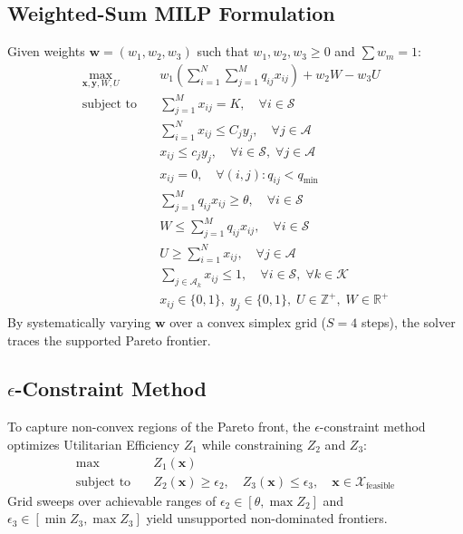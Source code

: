 \subsection{Weighted-Sum MILP Formulation}
Given weights $\mathbf{w} = (w_1, w_2, w_3)$ such that $w_1, w_2, w_3 \ge 0$ and $\sum w_m = 1$:
\begin{align}
    \max_{\mathbf{x}, \mathbf{y}, W, U} \quad & w_1 \left( \sum_{i=1}^N \sum_{j=1}^M q_{ij} x_{ij} \right) + w_2 W - w_3 U \label{eq:milp_obj} \\
    \text{subject to} \quad & \sum_{j=1}^M x_{ij} = K, \quad \forall i \in \mathcal{S} \label{eq:milp_c1} \\
    & \sum_{i=1}^N x_{ij} \le C_j y_j, \quad \forall j \in \mathcal{A} \label{eq:milp_c2} \\
    & x_{ij} \le c_j y_j, \quad \forall i \in \mathcal{S}, \; \forall j \in \mathcal{A} \label{eq:milp_c3} \\
    & x_{ij} = 0, \quad \forall (i, j): q_{ij} < q_{\min} \label{eq:milp_c4} \\
    & \sum_{j=1}^M q_{ij} x_{ij} \ge \theta, \quad \forall i \in \mathcal{S} \label{eq:milp_c5} \\
    & W \le \sum_{j=1}^M q_{ij} x_{ij}, \quad \forall i \in \mathcal{S} \label{eq:milp_w} \\
    & U \ge \sum_{i=1}^N x_{ij}, \quad \forall j \in \mathcal{A} \label{eq:milp_u} \\
    & \sum_{j \in \mathcal{A}_k} x_{ij} \le 1, \quad \forall i \in \mathcal{S}, \; \forall k \in \mathcal{K} \label{eq:milp_c7} \\
    & x_{ij} \in \{0, 1\}, \; y_j \in \{0, 1\}, \; U \in \mathbb{Z}^+, \; W \in \mathbb{R}^+
\end{align}
By systematically varying $\mathbf{w}$ over a convex simplex grid ($S = 4$ steps), the solver traces the supported Pareto frontier.

\subsection{$\epsilon$-Constraint Method}
To capture non-convex regions of the Pareto front, the $\epsilon$-constraint method optimizes Utilitarian Efficiency $Z_1$ while constraining $Z_2$ and $Z_3$:
\begin{align}
    \max \quad & Z_1(\mathbf{x}) \\
    \text{subject to} \quad & Z_2(\mathbf{x}) \ge \epsilon_2, \quad Z_3(\mathbf{x}) \le \epsilon_3, \quad \mathbf{x} \in \mathcal{X}_{\text{feasible}}
\end{align}
Grid sweeps over achievable ranges of $\epsilon_2 \in [\theta, \max Z_2]$ and $\epsilon_3 \in [\min Z_3, \max Z_3]$ yield unsupported non-dominated frontiers.

